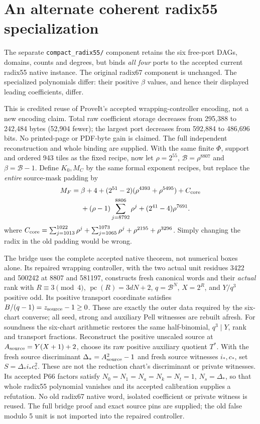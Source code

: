 \section{An alternate coherent radix55 specialization}
The separate \texttt{compact\_radix55/} component retains the six free-port
DAGs, domains, counts and degrees, but binds \emph{all four} ports to the
accepted current radix55 native instance. The original radix67 component
is unchanged. The specialized polynomials differ: their positive $\beta$
values, and hence their displayed leading coefficients, differ.

This is credited reuse of ProveIt's accepted wrapping-controller encoding,
not a new encoding claim. Total raw coefficient storage decreases from
295,388 to 242,484 bytes (52,904 fewer); the largest port decreases from
592,884 to 486,696 bits. No printed-page or PDF-byte gain is claimed.
The full independent reconstruction and whole binding are supplied.
With the same finite $\Phi$, support and ordered 943 tiles as the fixed
recipe, now let $\rho=2^{55}$, $\mathcal B=\rho^{8807}$ and
$\beta=\mathcal B-1$. Define $K_0,M_C$ by the same formal exponent
recipes, but replace the \emph{entire} source-mask padding by
\[
\begin{aligned}
M_F={}&\beta+4+(2^{51}-2)(\rho^{4393}+\rho^{5495})+C_{\rm core}\\
 &+(\rho-1)\sum_{j=8792}^{8806}\rho^j+(2^{41}-4)\rho^{7691}.
\end{aligned}
\]
where $C_{\rm core}=\sum_{j=1013}^{1022}\rho^j+
\sum_{j=1065}^{1073}\rho^j+\rho^{2195}+\rho^{3296}$.
Simply changing the radix in the old padding would be wrong.

The bridge uses the complete accepted native theorem, not numerical boxes
alone. Its repaired wrapping controller, with the two actual unit residues
3422 and 500242 at 8807 and 581197, constructs fresh canonical words and their
\emph{actual} rank with $R\equiv3\pmod4$, $\operatorname{pc}(R)=3dN+2$,
$q=\mathcal B^N$, $X=2^R$, and $Y/q^3$ positive odd.
Its positive transport coordinate satisfies $B/(q-1)=z_{\rm source}-1\ge0$.
These are exactly the outer data required by the six-chart converse;
all seed, strong and auxiliary Pell witnesses are rebuilt afresh.
For soundness the six-chart arithmetic restores the same half-binomial,
$q^3\mid Y$, rank and transport fractions. Reconstruct the positive
unscaled source at $A_{\rm source}=Y(X+1)+2$, choose its raw positive
auxiliary quotient $T^*$. With the fresh source discriminant
$\Delta_*=A_{\rm source}^2-1$ and fresh source witnesses $i_*,c_*$,
set $S=\Delta_* i_*c_*^2$. These are not the reduction chart's discriminant or private witnesses.
Its accepted P66 factors satisfy
$N_0=N_1=N_a=N_k=N_t=1$, $N_s=\Delta_*$, so that whole radix55
polynomial vanishes and its accepted calibration supplies a refutation.
No old radix67 native word, isolated coefficient or private witness is reused.
The full bridge proof and exact source pins are supplied; the old false
modulo 5 unit is not imported into the repaired controller.
